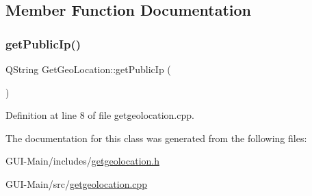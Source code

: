 \subsection{Member Function Documentation}
\mbox{\label{classGetGeoLocation_a2ea05cee775ed59dc9b0149f30a8b1f8}} 
\subsubsection{\texorpdfstring{get\+Public\+Ip()}{getPublicIp()}}
{\footnotesize\ttfamily Q\+String Get\+Geo\+Location\+::get\+Public\+Ip (\begin{DoxyParamCaption}{ }\end{DoxyParamCaption})}



Definition at line 8 of file getgeolocation.\+cpp.



The documentation for this class was generated from the following files\+:\begin{DoxyCompactItemize}
\item 
G\+U\+I-\/\+Main/includes/\hyperlink{getgeolocation_8h}{getgeolocation.\+h}\item 
G\+U\+I-\/\+Main/src/\hyperlink{getgeolocation_8cpp}{getgeolocation.\+cpp}\end{DoxyCompactItemize}
